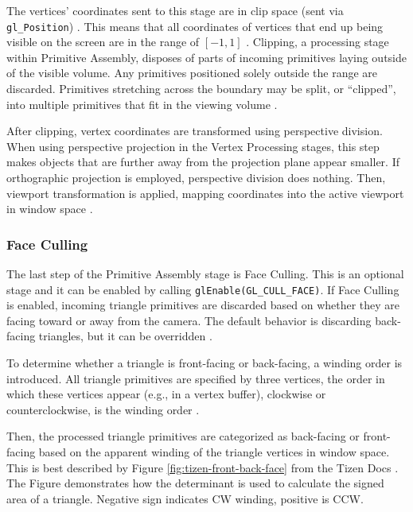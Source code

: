 \documentclass[
  digital,     %
  oneside,     %
  nosansbold,  %
  nocolorbold, %
  lof,         %
  lot,         %
]{fithesis4}
\begin{document}
The vertices' coordinates sent to this stage are in clip space (sent via \verb|gl_Position|) \cite{openglwiki-vertex-post-processing}.
This means that all coordinates of vertices that end up being visible on the screen are in the range of $[-1,1]$
\cite{learnopengl-coord-systems}. Clipping, a processing stage within Primitive Assembly, disposes of
parts of incoming primitives laying outside of the visible volume. Any primitives positioned solely outside the range
are discarded. Primitives stretching across the boundary may be split, or \enquote{clipped}, into multiple primitives
that fit in the viewing volume \cite[p.12]{opengl-book}.

After clipping, vertex coordinates are transformed using perspective division.
When using perspective projection in the Vertex Processing stages, this step makes objects that are
further away from the projection plane appear smaller. If orthographic projection is employed,
perspective division does nothing.
Then, viewport transformation is applied, mapping coordinates
into the active viewport in window space \cite[p.12]{opengl-book}.

\subsubsection{Face Culling}
The last step of the Primitive Assembly stage is Face Culling. This is an optional stage and
it can be enabled by calling \verb|glEnable(GL_CULL_FACE)|.
If Face Culling is enabled, incoming triangle primitives are discarded based on whether they are facing toward or away from the camera.
The default behavior is discarding back-facing triangles, but it can be overridden \cite{openglwiki-face-culling}.

To determine whether a triangle is front-facing or back-facing, a winding order is introduced. All triangle primitives
are specified by three vertices, the order in which these vertices appear (e.g., in a vertex buffer),
clockwise or counterclockwise, is the winding order \cite{openglwiki-face-culling}\cite{tizen-face-culling}.

Then, the processed triangle primitives are categorized as back-facing or front-facing based on the apparent
winding of the triangle vertices in window space. This is best described by Figure \ref{fig:tizen-front-back-face}
from the Tizen Docs \cite{tizen-face-culling}. The Figure demonstrates how the determinant
is used to calculate the signed area of a triangle. Negative sign indicates CW winding,
positive is CCW.
\end{document}

